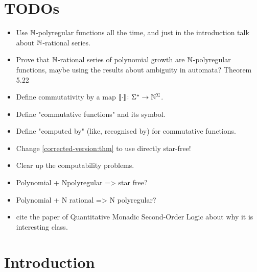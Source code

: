 \documentclass[a4paper,11pt]{article}
\begin{document}
\maketitle
\makeabstract
\acknowledge

\section{TODOs}

\begin{itemize}
    \item Use $\mathbb{N}$-polyregular functions all the time, and just 
        in the introduction talk about $\mathbb{N}$-rational series.
    \item Prove that $\mathbb{N}$-rational series of polynomial 
        growth are $\mathbb{N}$-polyregular functions, maybe using
        the results about ambiguity in automata?
        Theorem 5.22
    \item Define commutativity by a map 
        $\commute \colon \Sigma^* \to \Nat^{\Sigma}$.
    \item Define "commutative functions" and its symbol.
    \item Define "computed by" (like, recognised by) for commutative 
        functions.
    \item Change \cref{corrected-version:thm} to use directly
        star-free!
    \item Clear up the computability problems.
    \item Polynomial + Npolyregular => star free?
    \item Polynomial + N rational => N polyregular?
    \item cite the paper of Quantitative Monadic Second-Order Logic
        about why it is interesting class.
\end{itemize}


\section{Introduction}
\end{document}
